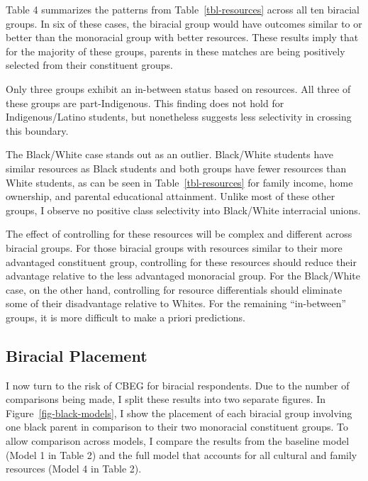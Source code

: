 \documentclass[
  12pt,
  letterpaper,
]{article}
\begin{document}
Table 4 summarizes the patterns from Table~\ref{tbl-resources} across
all ten biracial groups. In six of these cases, the biracial group would
have outcomes similar to or better than the monoracial group with better
resources. These results imply that for the majority of these groups,
parents in these matches are being positively selected from their
constituent groups.

Only three groups exhibit an in-between status based on resources. All
three of these groups are part-Indigenous. This finding does not hold
for Indigenous/Latino students, but nonetheless suggests less
selectivity in crossing this boundary.

The Black/White case stands out as an outlier. Black/White students have
similar resources as Black students and both groups have fewer resources
than White students, as can be seen in Table~\ref{tbl-resources} for
family income, home ownership, and parental educational attainment.
Unlike most of these other groups, I observe no positive class
selectivity into Black/White interracial unions.

The effect of controlling for these resources will be complex and
different across biracial groups. For those biracial groups with
resources similar to their more advantaged constituent group,
controlling for these resources should reduce their advantage relative
to the less advantaged monoracial group. For the Black/White case, on
the other hand, controlling for resource differentials should eliminate
some of their disadvantage relative to Whites. For the remaining
``in-between'' groups, it is more difficult to make a priori
predictions.

\hypertarget{biracial-placement}{%
\subsection{Biracial Placement}\label{biracial-placement}}

I now turn to the risk of CBEG for biracial respondents. Due to the
number of comparisons being made, I split these results into two
separate figures. In Figure~\ref{fig-black-models}, I show the placement
of each biracial group involving one black parent in comparison to their
two monoracial constituent groups. To allow comparison across models, I
compare the results from the baseline model (Model 1 in Table 2) and the
full model that accounts for all cultural and family resources (Model 4
in Table 2).
\end{document}
